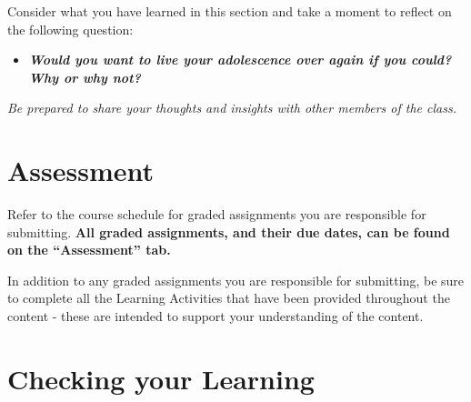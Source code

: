 \documentclass[
]{book}
\providecommand{\tightlist}{%
  \setlength{\itemsep}{0pt}\setlength{\parskip}{0pt}}
\begin{document}
\begin{reflect}
Consider what you have learned in this section and take a moment to reflect on the following question:

\begin{itemize}
\tightlist
\item
  \textbf{\emph{Would you want to live your adolescence over again if you could? Why or why not?}}
\end{itemize}

\emph{Be prepared to share your thoughts and insights with other members of the class.}
\end{reflect}

\hypertarget{assessment-2}{%
\section*{Assessment}\label{assessment-2}}

\begin{assessment}
Refer to the course schedule for graded assignments you are responsible for submitting. \textbf{All graded assignments, and their due dates, can be found on the ``Assessment'' tab.}

In addition to any graded assignments you are responsible for submitting, be sure to complete all the Learning Activities that have been provided throughout the content - these are intended to support your understanding of the content.
\end{assessment}

\hypertarget{checking-your-learning-2}{%
\section*{Checking your Learning}\label{checking-your-learning-2}}
\end{document}
